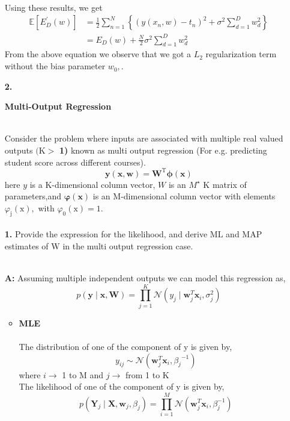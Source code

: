 \documentclass[english,a4paper,12pt]{article}
\begin{document}
\begin{enumerate}
$$\begin{aligned}
\end{aligned}
$$
Using these results, we get
$$
\begin{aligned}
\mathbb{E}\left[E_{D}^{\prime}(w)\right] &=\frac{1}{2} \sum_{n=1}^{N}\left\{\left(y\left(x_{n}, w\right)-t_{n}\right)^{2}+\sigma^2\sum_{d=1}^{D} w_{d}^{2}\right\} \\
&=E_{D}(w)+\frac{N}{2}\sigma^2 \sum_{d=1}^{D} w_{d}^{2} 
\end{aligned}
$$
From the above equation we observe that we got a $L_{2}$ regularization term without the bias parameter $w_{0},$.
\newpage
\item[\textbf{2.}] {\begin{center}
       \large{\textbf{Multi-Output Regression}}  \\~\\
   \end{center}
Consider the problem where inputs are associated with multiple real valued outputs $(\mathrm{K}>$
\textbf{1)} known as multi output regression (For e.g. predicting student score across different courses).
$$
\mathbf{y}\left(\mathbf{x}, \mathbf{w}\right)=\mathbf{W}^{\mathrm{T}} \boldsymbol{\phi}(\mathbf{x})
$$
here $y$ is a K-dimensional column vector, $W$ is an $M^{\star}$ K matrix of parameters,and $\boldsymbol{\varphi(x)}$ is an M-dimensional column vector with elements $\varphi_\mathrm{j}(\mathrm{x}),$ with $\varphi_0(\mathrm{x})=1$. \\~\\
\textbf{1.} Provide the expression for the likelihood, and derive $\mathrm{ML}$ and MAP estimates of $\mathrm{W}$ in
the multi output regression case.
}\\
\textbf{A:}
Assuming multiple independent outputs we can model this regression as,\\
$$p(\mathbf{y} \mid \mathbf{x}, \mathbf{W})=\prod_{j=1}^{K} \mathcal{N}\left(y_{j} \mid \mathbf{w}_{j}^{T} \mathbf{x}_{i}, \sigma_{j}^{2}\right)$$
    \begin{itemize}
        \item \textbf{MLE}\\~\\
        The distribution of one of the component of y is given by, 
$$
y_{ij} \sim \mathcal{N}\left(\mathbf{w}_{j}^{T} \mathbf{x}_{i}, {\beta_j}^{-1}\right)
$$
where $i \rightarrow$ 1 to M and $j \rightarrow$ from 1 to K\\
The likelihood of one of the component of y is given by,\\
$$
p(\mathbf{Y}_{j} \mid \mathbf{X}, \mathbf{w}_{j}, \beta_{j})=\prod_{i=1}^{M} \mathcal{N}\left(\mathbf{w}_{j}^{T} \mathbf{x}_{i}, \beta_{j}^{-1}\right)
$$
\end{itemize}
\end{enumerate}
\end{document}
